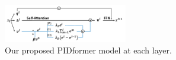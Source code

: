\begin{figure}[!t]
\centering
\includegraphics[width=0.48\textwidth]{iclr_2023/pictures/pid.pdf}
\vspace{-0.3in}
\caption{\small Our proposed PIDformer model at each layer.}
\label{fig:pid-illustrate} 
\end{figure}